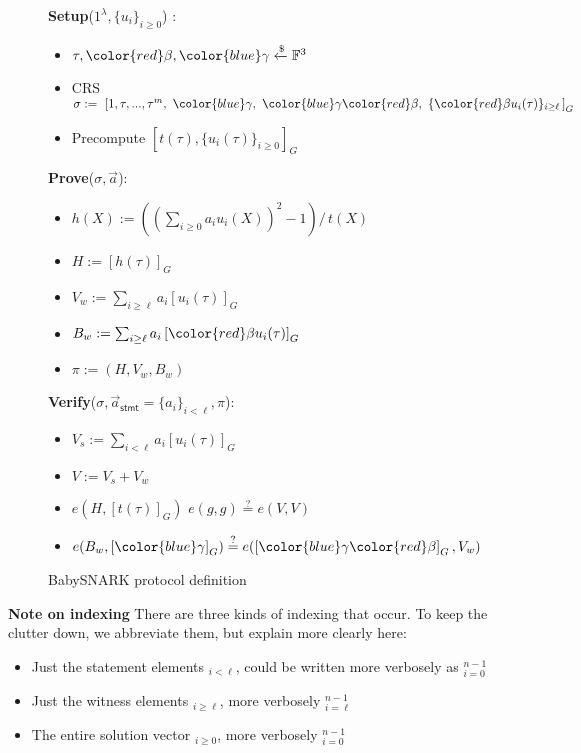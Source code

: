\documentclass{article}
\theoremstyle{definition}
\theoremstyle{remark}
\newcommand{\F}{\mathbb{F}}
\begin{document}
\begin{figure}[ht]
\textbf{Setup}($1^\lambda,\{u_i\}_{i \ge 0}$) : 

\begin{itemize}
    \item[] $\tau,{\color{red}\beta},{\color{blue}\gamma} \xleftarrow{\$} \F^3$
\item[]CRS $\sigma := \,\, 
                        \left[ %
                         1, \tau,...,{\tau}^m,\,\, {\color{blue}\gamma},\,\,
                         {\color{blue}\gamma}
                         {\color{red}\beta},\,\, 
                       \{{\color{red}\beta} u_i(\tau)\}_{i \ge \ell} \,
                       \right]_G
                      $
   \item[] Precompute $\left[ t(\tau), \{ u_i(\tau) \}_{i \ge 0} \right]_G$
\end{itemize}
\textbf{Prove}($\sigma, \vec{a}$):
\begin{itemize}[parsep=2pt]
\item[] $h(X) :=  \left(\left({\sum_{i\ge 0} a_i u_i(X)}\right)^2 - 1\right) / \, {t(X)}$
\item[] $H := \left[ h(\tau) \right]_G$
\item[] $V_w :=  \sum_{i \ge \ell} a_i \left[u_i(\tau) \right]_G$
\item[] $B_w :=  \sum_{i \ge \ell} a_i \left[ {\color{red}\beta} u_i(\tau) \right]_G$
\item[]  $\pi := (H,V_w,B_w)$
\end{itemize}

\textbf{Verify}($\sigma, \vec{a}_\textsf{stmt}=\{a_i\}_{i<\ell}, \pi$):
\begin{itemize}[parsep=2pt]
\item[] $V_s := \sum_{i<\ell} a_i \left[ u_i(\tau) \right]_G$
\item[] $V := V_s + V_w$
\item[] $e(H,\left[ t(\tau) \right]_G) \,\, e(g,g) \overset{?}{=} e(V,V)$
\item[] $e(B_w, \left[ {\color{blue}\gamma} \right]_G) \overset{?}{=} e( \left[ {\color{blue}\gamma} {\color{red}\beta} \right]_G, V_w)$
\end{itemize}
\caption{BabySNARK protocol definition}
\label{fig:babysnark}
\end{figure}

\textbf{Note on indexing}
There are three kinds of indexing that occur. To keep the clutter down, we abbreviate them, but explain more clearly here:
\begin{itemize}
  \item Just the statement elements $_{i<\ell}$, could be written more verbosely as $_{i=0}^{n-1}$
  \item Just the witness elements $_{i\ge\ell}$, more verbosely $_{i=\ell}^{n-1}$
  \item The entire solution vector $_{i\ge0}$, more verbosely $_{i=0}^{n-1}$
\end{itemize}
\end{document}

